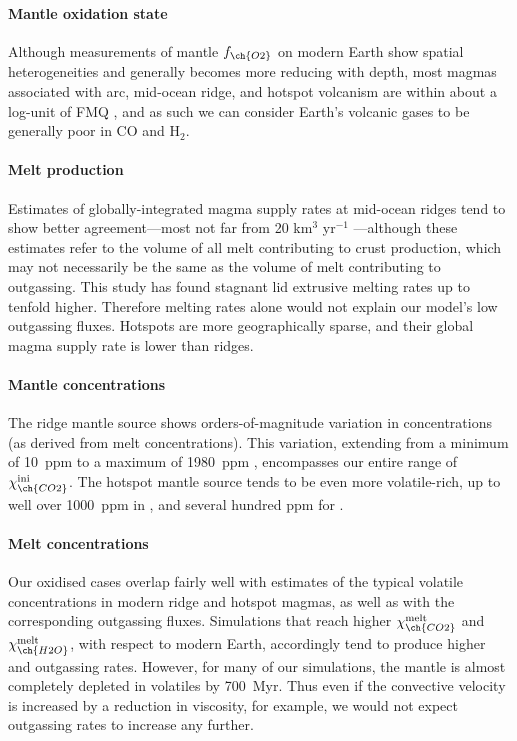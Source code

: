 \paragraph{Mantle oxidation state} Although measurements of mantle $f_{\ch{O2}}$ on modern Earth show spatial heterogeneities and generally becomes more reducing with depth, most magmas associated with arc, mid-ocean ridge, and hotspot volcanism are within about a log-unit of FMQ \citep[e.g.,][]{gaillard_diverse_2021}, and as such we can consider Earth's volcanic gases to be generally poor in CO and H$_2$.

\paragraph{Melt production} Estimates of globally-integrated magma supply rates at mid-ocean ridges tend to show better agreement---most not far from 20 km$^3$ yr$^{-1}$ \citep{Crisp1984, Mjelde2010, Voyer2019}---although these estimates refer to the volume of all melt contributing to crust production, which may not necessarily be the same as the volume of melt contributing to outgassing. This study has found stagnant lid extrusive melting rates up to tenfold higher. Therefore melting rates alone would not explain our model's low outgassing fluxes. Hotspots are more geographically sparse, and their global magma supply rate is lower than ridges.


\paragraph{Mantle concentrations} The ridge mantle source shows orders-of-magnitude variation in  concentrations (as derived from melt concentrations). This variation, extending from a minimum of 10~ppm to a maximum of 1980~ppm \citep{Hauri2019}, encompasses our entire range of $\chi_{\ch{CO2}}^{\rm{ini}}$. The hotspot mantle source tends to be even more volatile-rich, up to well over 1000~ppm in , and several hundred ppm for  \citep{Wallace1998, MILLER2019}.


\paragraph{Melt concentrations} Our oxidised cases overlap fairly well with estimates of the typical volatile concentrations in modern ridge and hotspot magmas, as well as with the corresponding outgassing fluxes. Simulations that reach higher $\chi_{\ch{CO2}}^{\rm melt}$ and $\chi_{\ch{H2O}}^{\rm melt}$, with respect to modern Earth, accordingly tend to produce higher  and  outgassing rates. However, for many of our simulations, the mantle is almost completely depleted in volatiles by 700~Myr. Thus even if the convective velocity is increased by a reduction in viscosity, for example, we would not expect outgassing rates to increase any further.






